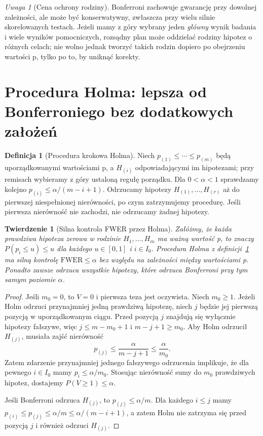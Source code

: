 \documentclass[11pt,a4paper,oneside]{report}
\numberwithin{equation}{chapter}
\theoremstyle{plain}
\newtheorem{twierdzenie}{Twierdzenie}[chapter]
\theoremstyle{definition}
\newtheorem{definicja}{Definicja}[chapter]
\theoremstyle{remark}
\newtheorem{uwaga}{Uwaga}[chapter]
\begin{document}
\begin{uwaga}[Cena ochrony rodziny]
Bonferroni zachowuje gwarancję przy dowolnej zależności,
ale może być konserwatywny, zwłaszcza przy wielu silnie
skorelowanych testach. Jeżeli mamy z góry wybrany
jeden \emph{główny} wynik badania i wiele wyników
pomocniczych, rozsądny plan może oddzielać rodziny
hipotez o różnych celach; nie wolno jednak tworzyć
takich rodzin dopiero po obejrzeniu wartości p, tylko
po to, by uniknąć korekty.
\end{uwaga}

\section{Procedura Holma: lepsza od Bonferroniego bez dodatkowych założeń}
\begin{definicja}[Procedura krokowa Holma]\label{def:holm}
Niech $p_{(1)}\le\cdots\le p_{(m)}$ będą uporządkowanymi
wartościami p, a $H_{(i)}$ odpowiadającymi im hipotezami;
przy remisach wybieramy z góry ustaloną regułę porządku.
Dla $0<\alpha<1$ sprawdzamy kolejno
$p_{(i)}\le\alpha/(m-i+1)$. Odrzucamy hipotezy
$H_{(1)},\ldots,H_{(r)}$ aż do pierwszej niespełnionej
nierówności, po czym zatrzymujemy procedurę.
Jeśli pierwsza nierówność nie zachodzi, nie odrzucamy
żadnej hipotezy.
\end{definicja}

\begin{twierdzenie}[Silna kontrola FWER przez Holma]
\label{thm:holm}
Załóżmy, że każda prawdziwa hipoteza zerowa w rodzinie
$H_1,\ldots,H_m$ ma ważną wartość p, to znaczy
$P(p_i\le u)\le u$ dla każdego $u\in[0,1]$ i
$i\in I_0$. Procedura Holma z definicji~\ref{def:holm}
ma silną kontrolę $\mathrm{FWER}\le\alpha$ bez względu
na zależności między wartościami p. Ponadto zawsze
odrzuca wszystkie hipotezy, które odrzuca Bonferroni
przy tym samym poziomie $\alpha$.
\end{twierdzenie}
\begin{proof}
Jeśli $m_0=0$, to $V=0$ i pierwsza teza jest oczywista.
Niech $m_0\ge1$. Jeżeli Holm odrzuci przynajmniej jedną
prawdziwą hipotezę, niech $j$ będzie jej pierwszą pozycją
w uporządkowanym ciągu. Przed pozycją $j$ znajdują się
wyłącznie hipotezy fałszywe, więc $j\le m-m_0+1$ i
$m-j+1\ge m_0$. Aby Holm odrzucił $H_{(j)}$, musiała
zajść nierówność
\[
 p_{(j)}\le\frac\alpha{m-j+1}\le\frac\alpha{m_0}.
\]
Zatem zdarzenie przynajmniej jednego fałszywego
odrzucenia implikuje, że dla pewnego $i\in I_0$ mamy
$p_i\le\alpha/m_0$. Stosując nierówność sumy do
$m_0$ prawdziwych hipotez, dostajemy $P(V\ge1)\le\alpha$.

Jeśli Bonferroni odrzuca $H_{(j)}$, to
$p_{(j)}\le\alpha/m$. Dla każdego $i\le j$
mamy $p_{(i)}\le p_{(j)}\le\alpha/m\le
\alpha/(m-i+1)$, a zatem Holm nie zatrzyma się
przed pozycją $j$ i również odrzuci $H_{(j)}$.
\end{proof}
\end{document}
